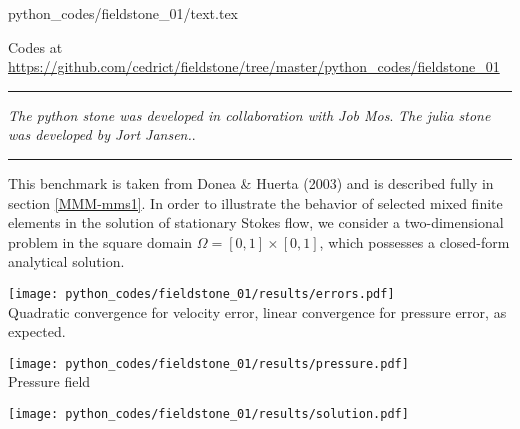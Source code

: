 \begin{flushright} {\tiny {\color{gray} python\_codes/fieldstone\_01/text.tex}} \end{flushright}



\begin{center}

Codes at \url{https://github.com/cedrict/fieldstone/tree/master/python_codes/fieldstone_01}
\end{center}

\par\noindent\rule{\textwidth}{0.4pt}

{\sl The python stone was developed in collaboration with Job Mos}. 
{\sl The julia stone was developed by Jort Jansen.}. 

\par\noindent\rule{\textwidth}{0.4pt}

This benchmark is taken from Donea \& Huerta (2003) \cite{dohu03} and is described fully in section \ref{MMM-mms1}. 
In order to illustrate the behavior of selected mixed finite elements in the solution 
of stationary Stokes flow,  we consider a two-dimensional problem 
in the square domain $\Omega=[0,1]\times[0,1]$, which possesses a closed-form analytical 
solution. 

\begin{center}
\texttt{[image: python\_codes/fieldstone\_01/results/errors.pdf]}\\
{\captionfont Quadratic convergence for velocity error, 
linear convergence for pressure error, as expected.}
\end{center}

\begin{center}
\texttt{[image: python\_codes/fieldstone\_01/results/pressure.pdf]}\\
{\captionfont Pressure field}
\end{center}

\begin{center}
\texttt{[image: python\_codes/fieldstone\_01/results/solution.pdf]}
\end{center}


